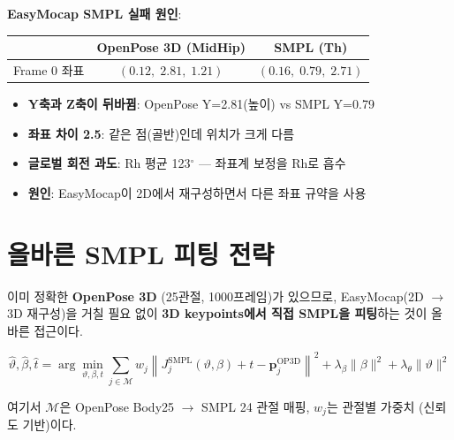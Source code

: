 \documentclass[11pt, a4paper]{report}
\begin{document}
\begin{warningbox}
\textbf{EasyMocap SMPL 실패 원인}:

\begin{table}[H]
\centering
\renewcommand{\arraystretch}{1.3}
\begin{tabular}{lcc}
\toprule
& \textbf{OpenPose 3D (MidHip)} & \textbf{SMPL (Th)} \\
\midrule
Frame 0 좌표 & $(0.12,\; 2.81,\; 1.21)$ & $(0.16,\; 0.79,\; 2.71)$ \\
\bottomrule
\end{tabular}
\end{table}

\begin{itemize}[nosep]
  \item \textbf{Y축과 Z축이 뒤바뀜}: OpenPose Y=2.81(높이) vs SMPL Y=0.79
  \item \textbf{좌표 차이 2.5}: 같은 점(골반)인데 위치가 크게 다름
  \item \textbf{글로벌 회전 과도}: Rh 평균 123$^\circ$ --- 좌표계 보정을 Rh로 흡수
  \item \textbf{원인}: EasyMocap이 2D에서 재구성하면서 다른 좌표 규약을 사용
\end{itemize}
\end{warningbox}

\section{올바른 SMPL 피팅 전략}

\begin{keyidea}
이미 정확한 \textbf{OpenPose 3D} (25관절, 1000프레임)가 있으므로,
EasyMocap(2D $\rightarrow$ 3D 재구성)을 거칠 필요 없이
\textbf{3D keypoints에서 직접 SMPL을 피팅}하는 것이 올바른 접근이다.

\begin{equation}
\hat{\vartheta}, \hat{\beta}, \hat{t} = \arg\min_{\vartheta, \beta, t}
\sum_{j \in \mathcal{M}} w_j \left\| J_j^{\text{SMPL}}(\vartheta, \beta) + t - \mathbf{p}_j^{\text{OP3D}} \right\|^2
+ \lambda_\beta \|\beta\|^2 + \lambda_\theta \|\vartheta\|^2
\end{equation}

여기서 $\mathcal{M}$은 OpenPose Body25 $\rightarrow$ SMPL 24 관절 매핑,
$w_j$는 관절별 가중치 (신뢰도 기반)이다.
\end{keyidea}
\end{document}
